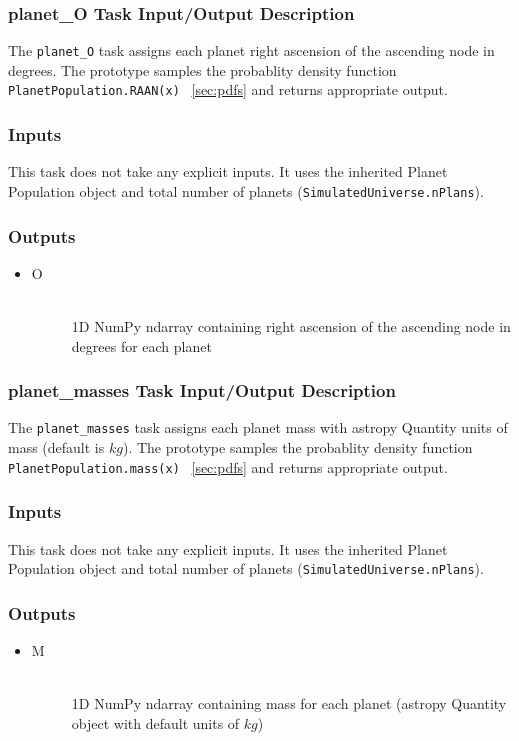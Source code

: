 \documentclass[cleanfoot]{asme2ej}
\begin{document}
\subsubsection{planet\_O Task Input/Output Description} \label{sec:planetOtask}
The \verb+planet_O+ task assigns each planet right ascension of the ascending node in degrees. The prototype samples the probablity density function \verb+PlanetPopulation.RAAN(x)+ ~\ref{sec:pdfs} and returns appropriate output.

\subsubsection*{Inputs}
This task does not take any explicit inputs.  It uses the inherited Planet Population object and total number of planets (\verb+SimulatedUniverse.nPlans+).

\subsubsection*{Outputs}
\begin{itemize}
    \item 
    \begin{description}
        \item[O] \hfill \\
        1D NumPy ndarray containing right ascension of the ascending node in degrees for each planet
    \end{description}
\end{itemize}

\subsubsection{planet\_masses Task Input/Output Description} \label{sec:planetmassestask}
The \verb+planet_masses+ task assigns each planet mass with astropy Quantity units of mass (default is $ kg $). The prototype samples the probablity density function \verb+PlanetPopulation.mass(x)+ ~\ref{sec:pdfs} and returns appropriate output.

\subsubsection*{Inputs}
This task does not take any explicit inputs.  It uses the inherited Planet Population object and total number of planets (\verb+SimulatedUniverse.nPlans+).

\subsubsection*{Outputs}
\begin{itemize}
    \item 
    \begin{description}
        \item[M] \hfill \\
        1D NumPy ndarray containing mass for each planet (astropy Quantity object with default units of $ kg $)
    \end{description}
\end{itemize}
\end{document}

